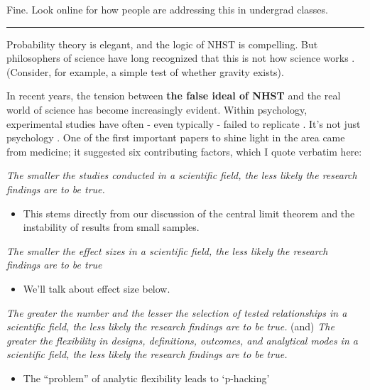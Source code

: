 \documentclass[
  openany]{book}
\providecommand{\tightlist}{%
  \setlength{\itemsep}{0pt}\setlength{\parskip}{0pt}}
\begin{document}
Fine. Look online for how people are addressing this in undergrad classes.

\begin{center}\rule{0.5\linewidth}{\linethickness}\end{center}

Probability theory is elegant, and the logic of NHST is compelling. But philosophers of science have long recognized that this is not how science works \citep{lakatos1969falsification}. (Consider, for example, a simple test of whether gravity exists).

In recent years, the tension between \textbf{the false ideal of NHST} and the real world of science has become increasingly evident. Within psychology, experimental studies have often - even typically - failed to replicate \citep{open2015estimating}. It's not just psychology \citep{baker2016reproducibility}. One of the first important papers to shine light in the area \citep{ioannidis2005most} came from medicine; it suggested six contributing factors, which I quote verbatim here:

\emph{The smaller the studies conducted in a scientific field, the less likely the research findings are to be true.}

\begin{itemize}
\tightlist
\item
  This stems directly from our discussion of the central limit theorem and the instability of results from small samples.
\end{itemize}

\emph{The smaller the effect sizes in a scientific field, the less likely the research findings are to be true}

\begin{itemize}
\tightlist
\item
  We'll talk about effect size below.
\end{itemize}

\emph{The greater the number and the lesser the selection of tested relationships in a scientific field, the less likely the research findings are to be true.} (and) \emph{The greater the flexibility in designs, definitions, outcomes, and analytical modes in a scientific field, the less likely the research findings are to be true.}

\begin{itemize}
\tightlist
\item
  The ``problem'' of analytic flexibility leads to `p-hacking'
\end{itemize}
\end{document}
